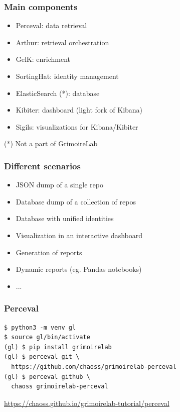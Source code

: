 \documentclass[17pt,aspectratio=169,hyperref=pdfusetitle]{beamer}
\begin{document}

\begin{frame}
\frametitle{Main components}

  \begin{itemize}
  \item Perceval: data retrieval
  \item Arthur: retrieval orchestration
  \item GelK: enrichment
  \item SortingHat: identity management
  \item ElasticSearch (*): database
  \item Kibiter: dashboard (light fork of Kibana)
  \item Sigils: visualizations for Kibana/Kibiter
  \end{itemize}

  (*) Not a part of GrimoireLab

\end{frame}


\begin{frame}
\frametitle{Different scenarios}

  \begin{itemize}
  \item JSON dump of a single repo
  \item Database dump of a collection of repos
  \item Database with unified identities
  \item Visualization in an interactive dashboard
  \item Generation of reports
  \item Dynamic reports (eg. Pandas notebooks)
  \item ...
  \end{itemize}

\end{frame}


\begin{frame}[fragile]
\frametitle{Perceval}

{\small
\begin{verbatim}
$ python3 -m venv gl
$ source gl/bin/activate
(gl) $ pip install grimoirelab
(gl) $ perceval git \
  https://github.com/chaoss/grimoirelab-perceval
(gl) $ perceval github \
  chaoss grimoirelab-perceval
\end{verbatim}
}

\vspace{1cm}
{\footnotesize
\begin{flushright}
  \href{chaoss.github.io/grimoirelab-tutorial/perceval}{https://chaoss.github.io/grimoirelab-tutorial/perceval}
\end{flushright}
}
\end{frame}
\end{document}
